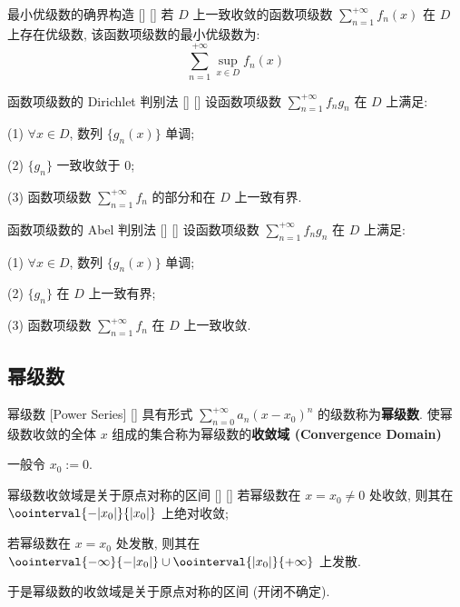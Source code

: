\documentclass[UTF8]{ctexart}
\begin{document}
			\begin{ppt}
			    []
			    {最小优级数的确界构造}
			    []
			    []
				若 \(D\) 上一致收敛的函数项级数 \(\sum\limits_{n=1}^{+\infty}f_n(x)\) 在 \(D\) 上存在优级数, 该函数项级数的最小优级数为: 
				\[\sum\limits_{n=1}^{+\infty}\sup_{x\in D}f_n(x)\]
			\end{ppt}

			\begin{thm}
			    []
			    {函数项级数的 Dirichlet 判别法}
			    []
			    []
				设函数项级数 \(\sum\limits_{n=1}^{+\infty}f_n g_n\) 在 \(D\) 上满足: 

				(1) \(\forall x\in D\), 数列 \(\{g_n(x)\}\) 单调; 

				(2) \(\{g_n\}\) 一致收敛于 \(0\); 
				
				(3) 函数项级数 \(\sum\limits_{n=1}^{+\infty}f_n\) 的部分和在 \(D\) 上一致有界.
			\end{thm}

			\begin{thm}
			    []
			    {函数项级数的 Abel 判别法}
			    []
			    []
				设函数项级数 \(\sum\limits_{n=1}^{+\infty}f_n g_n\) 在 \(D\) 上满足: 

				(1) \(\forall x\in D\), 数列 \(\{g_n(x)\}\) 单调; 

				(2) \(\{g_n\}\) 在 \(D\) 上一致有界; 
				
				(3) 函数项级数 \(\sum\limits_{n=1}^{+\infty}f_n\) 在 \(D\) 上一致收敛.
			\end{thm}

		\subsection{幂级数}

			\begin{dfn}
			    []
			    {幂级数 }
			    [Power Series]
			    []
				具有形式 \(\sum\limits_{n=0}^{+\infty}a_n{(x-x_0)}^n\) 的级数称为\textbf{幂级数}. 使幂级数收敛的全体 \(x\) 组成的集合称为幂级数的\textbf{收敛域 (Convergence Domain)}

				一般令 \(x_0:=0\). 
			\end{dfn}

			\begin{ppt}
			    []
			    {幂级数收敛域是关于原点对称的区间}
			    []
			    []
				若幂级数在 \(x=x_0\neq 0\) 处收敛, 则其在 \(\oointerval{-|x_0|}{|x_0|}\) 上绝对收敛; 
				
				若幂级数在 \(x=x_0\) 处发散, 则其在 \(\oointerval{-\infty}{-|x_0|}\cup\oointerval{|x_0|}{+\infty}\) 上发散. 

				于是幂级数的收敛域是关于原点对称的区间 (开闭不确定). 
			\end{ppt}
\end{document}
